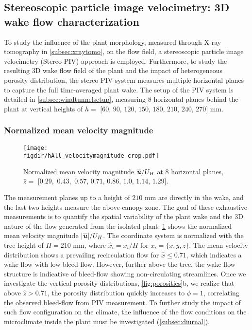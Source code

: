 \subsection{Stereoscopic particle image velocimetry: 3D wake flow characterization }
\label{subsec:stereopiv}

To study the influence of the plant morphology, measured through X-ray tomography in \cref{subsec:xraytomo}, on the flow field, a stereoscopic particle image velocimetry (Stereo-PIV) approach is employed. Furthermore, to study the resulting 3D wake flow field of the plant and the impact of heterogeneous porosity distribution, the stereo-PIV system measures multiple horizontal planes to capture the full time-averaged plant wake. The setup of the PIV system is detailed in \cref{subsec:windtunnelsetup}, measuring 8 horizontal planes behind the plant at vertical heights of $h =$ $[60$, $90$, $120$, $150$, $180$, $210$, $240$, $270]$ mm.

\subsubsection*{Normalized mean velocity magnitude}
	
\begin{sidewaysfigure}[p]
	\centering
	\texttt{[image: \\figdir/hAll\_velocitymagnitude-crop.pdf]}
	\caption{Normalized mean velocity magnitude $\overline{\textbf{\textit{u}}}/U_H$ at 8 horizontal planes, $\hat{z}=$ [$0.29$,~$0.43$,~$0.57$, $0.71$, $0.86$, $1.0$, $1.14$, $1.29]$.}
	\label{fig:meanflow}
\end{sidewaysfigure}

The measurement planes up to a height of $210$ mm are directly in the wake, and the last two heights measure the above-canopy zone. The goal of these exhaustive measurements is to quantify the spatial variability of the plant wake and the 3D nature of the flow generated from the isolated plant. \cref{fig:meanflow} shows the normalized mean velocity magnitude $|\overline{\textbf{\textit{u}}}|/U_H$. The coordinate system is normalized with the tree height of $H=210$ mm, where $\hat{x}_i = x_i / H$ for $x_i =\{x,y,z\}$. The mean velocity distribution shows a prevailing recirculation flow for $\hat{x} \le 0.71$, which indicates a wake flow with low bleed-flow. However, further above the tree, the wake flow structure is indicative of bleed-flow showing non-circulating streamlines. Once we investigate the vertical porosity distributions, \cref{fig:porosities}b, we realize that above $\hat{z}>0.71$, the porosity distribution quickly increases to $\phi=1$, correlating the observed bleed-flow from PIV measurement. To further study the impact of such flow configuration on the climate, the influence of the flow conditions on the microclimate inside the plant must be investigated (\cref{subsec:diurnal}). 


